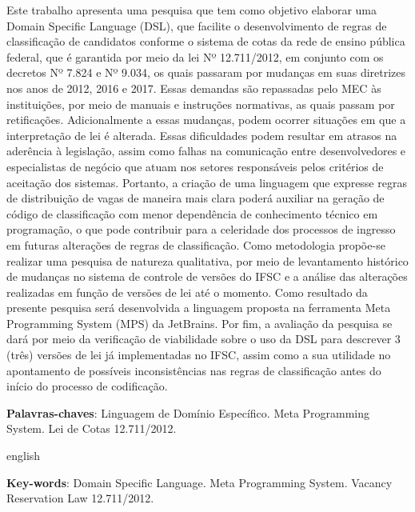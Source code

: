 
\begin{resumo}[Resumo] \noindent 
Este trabalho apresenta uma pesquisa que tem como objetivo elaborar uma Domain Specific Language (DSL), que facilite o desenvolvimento de regras de classificação de candidatos conforme o sistema de cotas da rede de ensino pública federal, que é garantida por meio da lei Nº 12.711/2012, em conjunto com os decretos Nº 7.824 e Nº 9.034, os quais passaram por mudanças em suas diretrizes nos anos de 2012, 2016 e 2017. Essas demandas são repassadas pelo \gls{MEC} às instituições, por meio de manuais e instruções normativas, as quais passam por retificações. Adicionalmente a essas mudanças, podem ocorrer situações em que a interpretação de lei é alterada. Essas dificuldades podem resultar em atrasos na aderência à legislação, assim como falhas na comunicação entre desenvolvedores e especialistas de negócio que atuam nos setores responsáveis pelos critérios de aceitação dos sistemas. Portanto, a criação de uma linguagem que expresse regras de distribuição de vagas de maneira mais clara poderá auxiliar na geração de código de classificação com menor dependência de conhecimento técnico em programação, o que pode contribuir para a celeridade dos processos de ingresso em futuras alterações de regras de classificação. Como metodologia propõe-se realizar uma pesquisa de natureza qualitativa, por meio de levantamento histórico de mudanças no sistema de controle de versões do \gls{IFSC} e a análise das alterações realizadas em função de versões de lei até o momento. Como resultado da presente pesquisa será desenvolvida a linguagem proposta na ferramenta Meta Programming System (MPS) da JetBrains. Por fim, a avaliação da pesquisa se dará por meio da verificação de viabilidade sobre o uso da DSL para descrever 3 (três) versões de lei já implementadas no IFSC, assim como a sua utilidade no apontamento de possíveis inconsistências nas regras de classificação antes do início do processo de codificação.

 \vspace{\onelineskip}
    
 \noindent
 \textbf{Palavras-chaves}: Linguagem de Domínio Específico. Meta Programming System. Lei de Cotas 12.711/2012.
\end{resumo}



\begin{resumo}[Abstract]
\begin{otherlanguage*}{english}

 \noindent
\lipsum[5]

   \vspace{\onelineskip}
 
   \noindent 
   \textbf{Key-words}: Domain Specific Language. Meta Programming System. Vacancy Reservation Law 12.711/2012.
 \end{otherlanguage*}
 \end{resumo}
